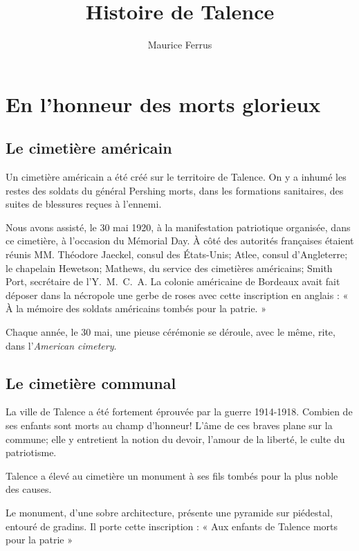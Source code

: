 \documentclass[a4paper,11pt]{book}
\begin{document}
\title{Histoire de Talence}
\author{Maurice Ferrus}
\frontmatter
\maketitle

\mainmatter{}

\section{En l'honneur des morts glorieux}
\subsection{Le cimetière américain}

Un cimetière américain a été créé sur le territoire de Talence. On y a inhumé les restes des soldats du général Pershing morts, dans les formations sanitaires, des suites de blessures reçues à l'ennemi.

Nous avons assisté, le 30 mai 1920, à la manifestation patriotique organisée, dans ce cimetière, à l'occasion du Mémorial Day. À côté des autorités françaises étaient réunis MM. Théodore Jaeckel, consul des États-Unis; Atlee, consul d'Angleterre; le chapelain Hewetson; Mathews, du service des cimetières américains; Smith Port, secrétaire de l'Y.~M.~C.~A. La colonie américaine de Bordeaux avait fait déposer dans la nécropole une gerbe de roses avec cette inscription en anglais : « À la mémoire des soldats américains tombés pour la patrie. »

Chaque année, le 30 mai, une pieuse cérémonie se déroule, avec le même, rite, dans l'\textit{American cimetery}.

\subsection{Le cimetière communal}

La ville de Talence a été fortement éprouvée par la guerre 1914-1918. Combien de ses enfants sont morts au champ d'honneur! L'âme de ces braves plane sur la commune; elle y entretient la notion du devoir, l'amour de la liberté, le culte du patriotisme.

Talence a élevé au cimetière un monument à ses fils tombés pour la plus noble des causes.

Le monument, d'une sobre architecture, présente une pyramide sur piédestal, entouré de gradins. Il porte cette inscription : « Aux enfants de Talence morts pour la patrie »
\end{document}
